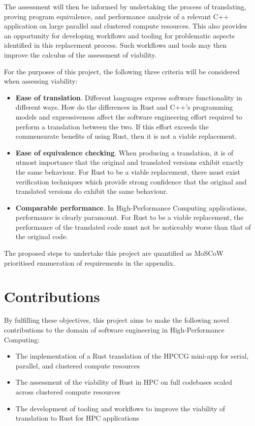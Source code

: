 The assessment will then be informed by undertaking the process of translating, proving program equivalence, and performance analysis of a relevant C++ application on large parallel and clustered compute resources. This also provides an opportunity for developing workflows and tooling for problematic aspects identified in this replacement process. Such workflows and tools may then improve the calculus of the assessment of viability.

For the purposes of this project, the following three criteria will be considered when assessing viability:

\begin{itemize}
    \item \textbf{Ease of translation}. Different languages express software functionality in different ways. How do the differences in Rust and C++'s programming models and expressiveness affect the software engineering effort required to perform a translation between the two. If this effort exceeds the commensurate benefits of using Rust, then it is not a viable replacement.
    \item \textbf{Ease of equivalence checking}. When producing a translation, it is of utmost importance that the original and translated versions exhibit exactly the same behaviour. For Rust to be a viable replacement, there must exist verification techniques which provide strong confidence that the original and translated versions do exhibit the same behaviour.
    \item \textbf{Comparable performance}. In High-Performance Computing applications, performance is clearly paramount. For Rust to be a viable replacement, the performance of the translated code must not be noticeably worse than that of the original code.
\end{itemize}

The proposed steps to undertake this project are quantified as MoSCoW prioritised \cite{CaseMethodFastTrack} enumeration of requirements in the appendix. %

\section{Contributions}
\label{sec:contributions}

By fulfilling these objectives, this project aims to make the following novel contributions to the domain of software engineering in High-Performance Computing:

\begin{itemize}
    \item The implementation of a Rust translation of the HPCCG mini-app for serial, parallel, and clustered compute resources
    \item The assessment of the viability of Rust in HPC on full codebases scaled across clustered compute resources
    \item The development of tooling and workflows to improve the viability of translation to Rust for HPC applications
\end{itemize}
